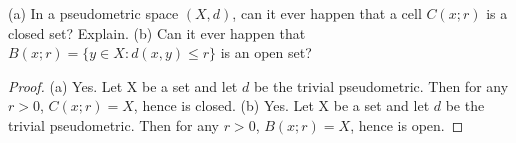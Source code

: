 \setcounter{question}{14} %
\begin{question}[Macula]

(a) In a pseudometric space $(X, d)$, can it ever happen that a cell $C(x; r)$ is a closed set? Explain.
\bigbreak
(b) Can it ever happen that $B(x; r) = \{y \in X : d(x, y) \leq r\}$ is an open set?

\end{question}

\begin{proof}
(a) Yes. Let X be a set and let $d$ be the trivial pseudometric. Then for any $r > 0$, $C(x; r) = X$, hence is closed. 
\bigbreak
(b) Yes. Let X be a set and let $d$ be the trivial pseudometric. Then for any $r > 0$, $B(x; r) = X$, hence is open. 

\end{proof}
	
